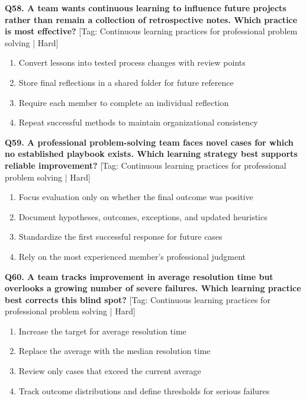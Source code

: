 \noindent\textbf{Q58. A team wants continuous learning to influence future projects rather than remain a collection of retrospective notes. Which practice is most effective?} \hfill [Tag: Continuous learning practices for professional problem solving | Hard]
\begin{enumerate}[label=(\alph*),topsep=2pt,itemsep=1pt,partopsep=0pt,parsep=0pt]
    \item {Convert lessons into tested process changes with review points}
    \item {Store final reflections in a shared folder for future reference}
    \item {Require each member to complete an individual reflection}
    \item {Repeat successful methods to maintain organizational consistency}
\end{enumerate}
\vspace{2mm}

\noindent\textbf{Q59. A professional problem-solving team faces novel cases for which no established playbook exists. Which learning strategy best supports reliable improvement?} \hfill [Tag: Continuous learning practices for professional problem solving | Hard]
\begin{enumerate}[label=(\alph*),topsep=2pt,itemsep=1pt,partopsep=0pt,parsep=0pt]
    \item {Focus evaluation only on whether the final outcome was positive}
    \item {Document hypotheses, outcomes, exceptions, and updated heuristics}
    \item {Standardize the first successful response for future cases}
    \item {Rely on the most experienced member's professional judgment}
\end{enumerate}
\vspace{2mm}

\noindent\textbf{Q60. A team tracks improvement in average resolution time but overlooks a growing number of severe failures. Which learning practice best corrects this blind spot?} \hfill [Tag: Continuous learning practices for professional problem solving | Hard]
\begin{enumerate}[label=(\alph*),topsep=2pt,itemsep=1pt,partopsep=0pt,parsep=0pt]
    \item {Increase the target for average resolution time}
    \item {Replace the average with the median resolution time}
    \item {Review only cases that exceed the current average}
    \item {Track outcome distributions and define thresholds for serious failures}
\end{enumerate}
\vspace{2mm}


